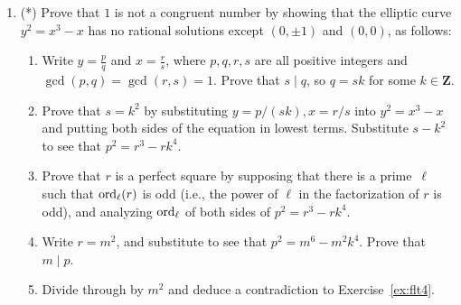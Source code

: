 \documentclass[11pt]{article}
\newcommand{\Z}{\mathbf{Z}}
\newcommand{\ord}{{\rm ord}}
\begin{document}
\begin{enumerate}
\item\label{ex:cong1}(*) Prove that $1$ is not a congruent number by
  showing that the elliptic curve $y^2=x^3-x$ has no rational
  solutions except $(0,\pm 1)$ and $(0,0)$, as follows:
\begin{enumerate}
\item Write $y=\frac{p}{q}$ and $x=\frac{r}{s}$, where $p,q,r,s$ are
all positive integers and $\gcd(p,q)=\gcd(r,s)=1$.  Prove that $s\mid
q$, so $q=sk$ for some $k\in\Z$.
\item Prove that $s=k^2$ by substituting $y=p/(sk), x=r/s$ into $y^2=x^3-x$
and putting both sides of the equation in lowest terms. Substitute $s-k^2$
to see that $p^2=r^3-rk^4$.
\item Prove that $r$ is a perfect square by supposing that there is a
  prime~$\ell$ such that $\ord_{\ell}(r)$ is odd (i.e., the power of $\ell$
in the factorization of $r$ is odd), and analyzing
  $\ord_{\ell}$ of both sides of $p^2=r^3-rk^4$.
\item Write $r=m^2$, and substitute to
see that $p^2=m^6-m^2k^4$. Prove that $m\mid p$.  
\item Divide through by $m^2$ and deduce a contradiction 
to Exercise~\ref{ex:flt4}.
\end{enumerate}

\end{enumerate}
\end{document}
